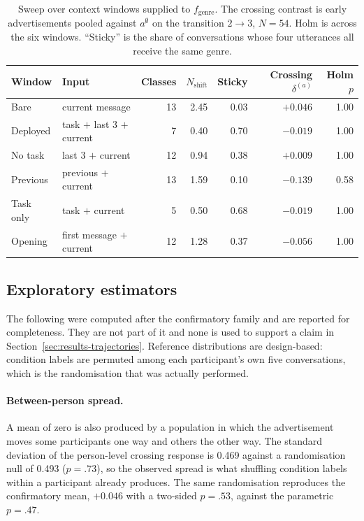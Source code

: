 \begin{table}[H]
\centering
\caption{Sweep over context windows supplied to \(f_{\mathrm{genre}}\). The crossing contrast is early advertisements pooled against \(a^{\emptyset}\) on the transition \(2\rightarrow3\), \(N=54\). Holm is across the six windows. ``Sticky'' is the share of conversations whose four utterances all receive the same genre.}
\label{tab:app-traj-sweep}
\begin{tabular}{llrrrrr}
\toprule
Window & Input & Classes & \(N_{\mathrm{shift}}\) & Sticky & Crossing \(\delta^{(a)}\) & Holm \(p\) \\
\midrule
Bare      & current message              & 13 & 2.45 & 0.03 & $+0.046$ & 1.00 \\
Deployed  & task \(+\) last 3 \(+\) current & 7  & 0.40 & 0.70 & $-0.019$ & 1.00 \\
No task   & last 3 \(+\) current         & 12 & 0.94 & 0.38 & $+0.009$ & 1.00 \\
Previous  & previous \(+\) current       & 13 & 1.59 & 0.10 & $-0.139$ & 0.58 \\
Task only & task \(+\) current           & 5  & 0.50 & 0.68 & $-0.019$ & 1.00 \\
Opening   & first message \(+\) current  & 12 & 1.28 & 0.37 & $-0.056$ & 1.00 \\
\bottomrule
\end{tabular}
\end{table}

\subsection{Exploratory estimators}
\label{sec:app-traj-exploratory}

The following were computed after the confirmatory family and are reported for completeness. They are not part of it and none is used to support a claim in Section~\ref{sec:results-trajectories}. Reference distributions are design-based: condition labels are permuted among each participant's own five conversations, which is the randomisation that was actually performed.

\paragraph{Between-person spread.}
A mean of zero is also produced by a population in which the advertisement moves some participants one way and others the other way. The standard deviation of the person-level crossing response is 0.469 against a randomisation null of 0.493 (\(p=.73\)), so the observed spread is what shuffling condition labels within a participant already produces. The same randomisation reproduces the confirmatory mean, \(+0.046\) with a two-sided \(p=.53\), against the parametric \(p=.47\).

